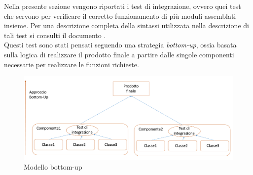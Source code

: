 	Nella presente sezione vengono riportati i test di integrazione, ovvero quei test che servono per verificare il corretto funzionamento di più moduli assemblati insieme. Per una descrizione completa della sintassi utilizzata nella descrizione di tali test si consulti il documento . \\
	Questi test sono stati pensati seguendo una strategia \textit{bottom-up}, ossia basata sulla logica di realizzare il prodotto finale a partire dalle singole componenti necessarie per realizzare le funzioni richieste.
	\begin{figure}[H]
		\centering
		\includegraphics[scale=0.4]{PianoDiQualifica/Pics/bottom-up.png}
		\caption{Modello bottom-up}
	\end{figure}

